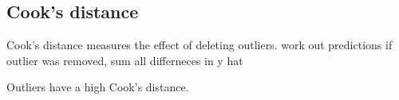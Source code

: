 
\subsection{Cook's distance}

Cook's distance measures the effect of deleting outliers.
work out predictions if outlier was removed, sum all differneces in y hat

Outliers have a high Cook's distance.


